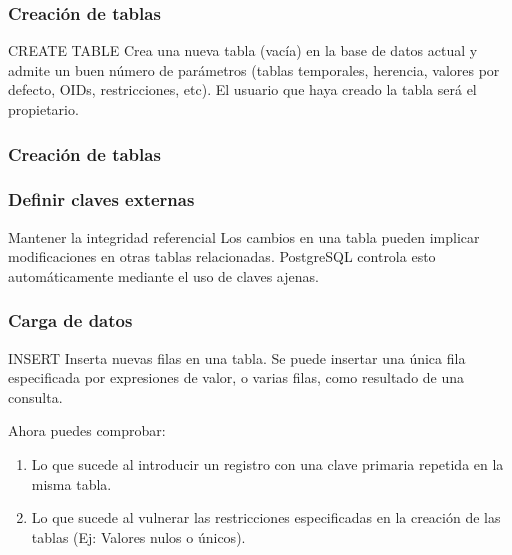 \documentclass{classes/beamer_GeomaticaUA}
\begin{document}
\begin{frame}[fragile]
\frametitle{Creación de tablas}

\begin{block}{CREATE TABLE}
Crea una nueva tabla (vacía) en la base de datos actual y admite un buen número de parámetros (tablas temporales, herencia, valores por defecto, OIDs, restricciones, etc). El usuario que haya creado la tabla será el propietario.
\end{block}



\end{frame}

\begin{frame}[fragile]
\frametitle{Creación de tablas}


\end{frame}

\begin{frame}[fragile]
\frametitle{Definir claves externas}

\begin{block}{Mantener la integridad referencial}
Los cambios en una tabla pueden implicar modificaciones en otras tablas relacionadas. PostgreSQL controla esto automáticamente mediante el uso de claves ajenas.
\end{block}



\end{frame}



\begin{frame}[fragile]
\frametitle{Carga de datos}
\begin{block}{INSERT}
Inserta nuevas filas en una tabla. Se puede insertar una única fila especificada por expresiones de valor, o varias filas, como resultado de una consulta.
\end{block}



Ahora puedes comprobar:
\begin{enumerate}
\item Lo que sucede al introducir un registro con una clave primaria repetida en la misma tabla.
\item Lo que sucede al vulnerar las restricciones especificadas en la creación de las tablas (Ej: Valores nulos o únicos).
\end{enumerate}

\end{frame}
\end{document}
